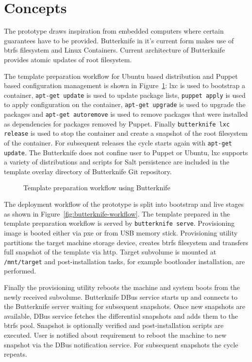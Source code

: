 \documentclass[a4paper,11pt]{kth-mag}
\begin{document}
\section{Concepts}
\label{sec:concepts}

The prototype draws inspiration from embedded computers
where certain guarantees have to be provided.
Butterknife in it's current form makes use of \acrshort{btrfs}
filesystem and Linux Containers.
Current architecture of Butterknife provides
atomic updates of root filesystem.

The template preparation workflow for
Ubuntu based distribution and Puppet based configuration
management is shown in
Figure~\ref{fig:template-preparation-workflow}:
\acrshort{lxc} is used to bootstrap a container,
\lstinline!apt-get update! is used to update package lists,
\lstinline!puppet apply! is used to apply configuration on the container,
\lstinline!apt-get upgrade! is used to upgrade the packages and
\lstinline!apt-get autoremove! is used to remove packages that
were installed as dependencies
for packages removed by Puppet.
Finally \lstinline!butterknife lxc release! is used to stop
the container and create a snapshot of the root filesystem of the container.
For subsequent releases the cycle starts again with \lstinline!apt-get update!.
The Butterknife does not confine user to Puppet or Ubuntu,
\acrshort{lxc} supports a variety of distributions and scripts for
Salt persistence are included in the template overlay
directory of Butterknife Git repository.

\begin{figure}[!htb]
\centering
\scalebox{0.6}{}
\caption{Template preparation workflow using Butterknife}
\label{fig:template-preparation-workflow}
\end{figure}

The deployment workflow of the prototype is split into
bootstrap and live stages as shown in
Figure~\ref{fig:butterknife-workflow}.
The template prepared in the template preparation workflow
is served by \lstinline!butterknife serve!.
Provisioning image is booted either via
\acrfull{pxe} or from USB memory stick.
Provisioning utility
partitions the target machine storage device,
creates \acrshort{btrfs} filesystem and
transfers full snapshot of the template via \acrfull{http}.
Target subvolume is mounted at \lstinline!/mnt/target!
and post-installation tasks, for example
bootloader installation, are performed.

Finally the provisioning utility reboots the machine
and system boots from the newly received subvolume.
Butterknife DBus service starts up and
connects to the Butterknife server waiting for
subsequent snapshots.
Once new snapshots are available,
DBus service fetches the differential snapshots and
adds them to the \acrshort{btrfs} pool.
Snapshot is optionally verified and post-installation
scripts are executed.
User is notified about requirement to reboot the
machine to new snapshot via the DBus notification service.
For subsequent snapshots the cycle repeats.
\end{document}
